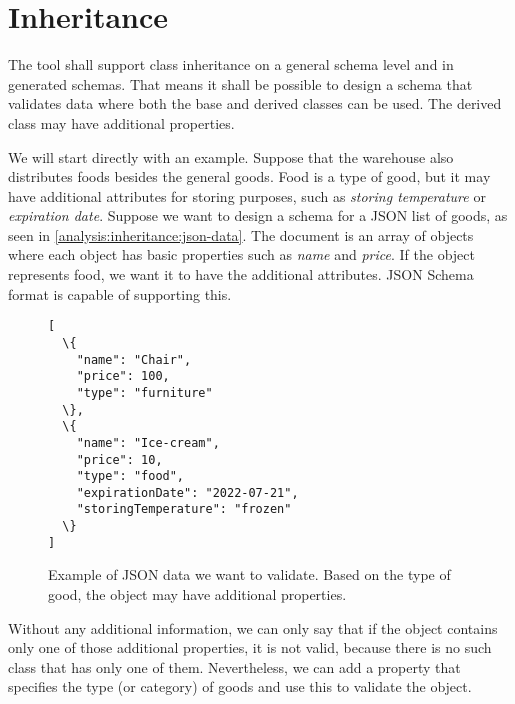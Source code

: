 

\section{Inheritance}

\begin{requirement}
    The tool shall support class inheritance on a general schema level and in generated schemas. That means it shall be possible to design a schema that validates data where both the base and derived classes can be used. The derived class may have additional properties.
    \label{requirement:inheritance}
\end{requirement}

\begin{showcase}
  We will start directly with an example. Suppose that the warehouse also distributes foods besides the general goods. Food is a type of good, but it may have additional attributes for storing purposes, such as \textit{storing temperature} or \textit{expiration date}. Suppose we want to design a schema for a JSON list of goods, as seen in \autoref{analysis:inheritance:json-data}. The document is an array of objects where each object has basic properties such as \textit{name} and \textit{price}. If the object represents food, we want it to have the additional attributes. JSON Schema format is capable of supporting this.

  \begin{figure}[H]\centering
      \begin{Verbatim}[commandchars=\\\{\}]
[
  \{
    "name": "Chair",
    "price": 100,
    "type": "furniture"
  \},
  \{
    "name": "Ice-cream",
    "price": 10,
    "type": "food",
    "expirationDate": "2022-07-21",
    "storingTemperature": "frozen"
  \}
]
      \end{Verbatim}
      \caption{Example of JSON data we want to validate. Based on the type of good, the object may have additional properties.}
      \label{analysis:inheritance:json-data}
  \end{figure}

    Without any additional information, we can only say that if the object contains only one of those additional properties, it is not valid, because there is no such class that has only one of them. Nevertheless, we can add a property that specifies the type (or category) of goods and use this to validate the object.
\end{showcase}

